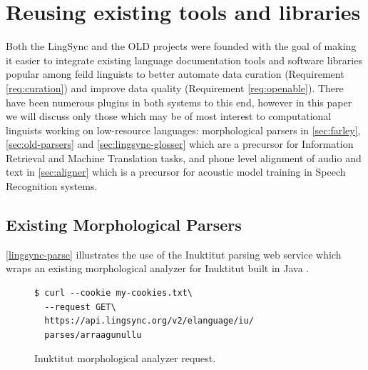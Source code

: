 \documentclass[11pt]{article}
\newcommand{\smalltodo}[2][]
    {\todo[caption={#2}, #1]
    {\tiny#2\normalsize}}
\begin{document}
\section{Reusing existing tools and libraries}
\label{sec:plugins}


Both the LingSync and the OLD projects were founded with the goal of making it easier to integrate existing language documentation tools and software libraries popular among feild linguists to better automate data curation (Requirement \autoref{req:curation}) and improve data quality (Requirement \autoref{req:openable}). There have been numerous plugins in both systems to this end, however in this paper we will discuss only those which may be of most interest to computational linguists working on low-resource languages: morphological parsers in \autoref{sec:farley},  \autoref{sec:old-parsers} and  \autoref{sec:lingsync-glosser} which are a precursor for Information Retrieval and Machine Translation tasks, and  phone level alignment of audio and text in  \autoref{sec:aligner} which is a precursor for acoustic model training in Speech Recognition systems.




\subsection{Existing Morphological Parsers}
\label{sec:farley}

\autoref{lingsync-parse} illustrates the use of the Inuktitut parsing web service which wraps an existing
morphological analyzer for Inuktitut built in Java \cite{Farley:2012:Online}.


\begin{figure}[h]
\scriptsize
\begin{verbatim}
$ curl --cookie my-cookies.txt\
  --request GET\
  https://api.lingsync.org/v2/elanguage/iu/
  parses/arraagunullu
\end{verbatim}
\normalsize
\caption{Inuktitut morphological analyzer request.}
\label{lingsync-parse}
\end{figure}
\end{document}
